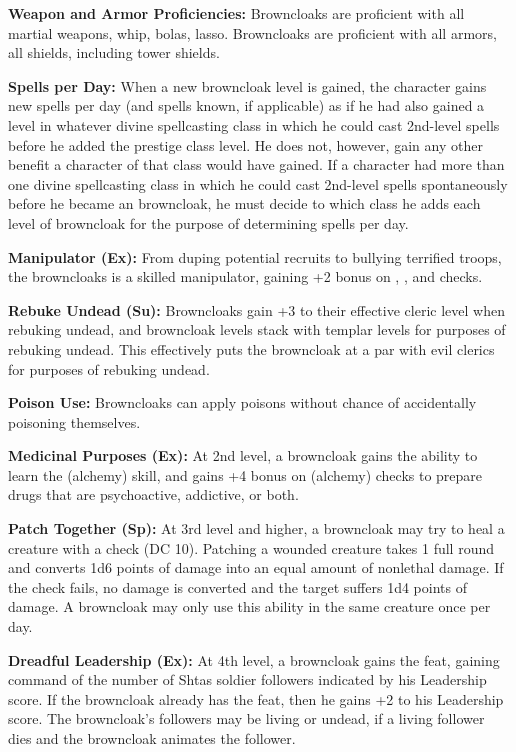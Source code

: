 {
\textbf{Weapon and Armor Proficiencies:} Browncloaks are proficient with all martial weapons, whip, bolas, lasso. Browncloaks are proficient with all armors, all shields, including tower shields.

\textbf{Spells per Day:} When a new browncloak level is gained, the character gains new spells per day (and spells known, if applicable) as if he had also gained a level in whatever divine spellcasting class in which he could cast 2nd-level spells before he added the prestige class level. He does not, however, gain any other benefit a character of that class would have gained. If a character had more than one divine spellcasting class in which he could cast 2nd-level spells spontaneously before he became an browncloak, he must decide to which class he adds each level of browncloak for the purpose of determining spells per day.

\textbf{Manipulator (Ex):} From duping potential recruits to bullying terrified troops, the browncloaks is a skilled manipulator, gaining +2 bonus on , , and  checks.

\textbf{Rebuke Undead (Su):} Browncloaks gain +3 to their effective cleric level when rebuking undead, and browncloak levels stack with templar levels for purposes of rebuking undead. This effectively puts the browncloak at a par with evil clerics for purposes of rebuking undead.

\textbf{Poison Use:} Browncloaks can apply poisons without chance of accidentally poisoning themselves.

\textbf{Medicinal Purposes (Ex):} At 2nd level, a browncloak gains the ability to learn the  (alchemy) skill, and gains +4 bonus on  (alchemy) checks to prepare drugs that are psychoactive, addictive, or both.

\textbf{Patch Together (Sp):} At 3rd level and higher, a browncloak may try to heal a creature with a  check (DC 10). Patching a wounded creature takes 1 full round and converts 1d6 points of damage into an equal amount of nonlethal damage. If the  check fails, no damage is converted and the target suffers 1d4 points of damage. A browncloak may only use this ability in the same creature once per day.

\textbf{Dreadful Leadership (Ex):} At 4th level, a browncloak gains the  feat, gaining command of the number of Shtas soldier followers indicated by his Leadership score. If the browncloak already has the  feat, then he gains +2 to his Leadership score. The browncloak's followers may be living or undead, if a living follower dies and the browncloak animates the follower.

}
